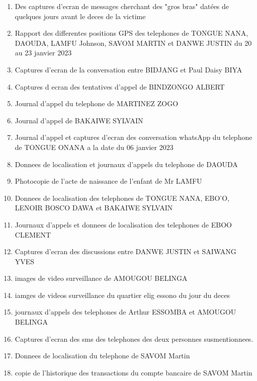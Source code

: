 \documentclass[12pt]{article}
\begin{document}
\begin{enumerate}

\item Des captures d'ecran de messages cherchant des "gros bras"  datées de quelques jours avant le deces de la victime

\item Rapport des differentes positions GPS des telephones de TONGUE NANA, DAOUDA, LAMFU Johnson, SAVOM MARTIN et DANWE JUSTIN du 20 au 23 janvier 2023

\item Captures d'ecran de la conversation entre BIDJANG et Paul Daisy BIYA 

\item Captures d
ecran des tentatives d'appel de BINDZONGO ALBERT

\item Journal d'appel du telephone de MARTINEZ ZOGO

\item Journal d'appel de BAKAIWE SYLVAIN

\item Journal d'appel et captures d'ecran des conversation whatsApp du telephone de TONGUE ONANA a la date du 06 janvier 2023

\item Donnees de localisation et journaux d'appels du telephone de DAOUDA

\item Photocopie de l'acte de naissance de l'enfant de Mr LAMFU

\item Donnees de localisation des telephones de TONGUE NANA, EBO'O, LENOIR BOSCO DAWA et BAKAIWE SYLVAIN

\item Journaux d'appels et donnees de localisation des telephones de EBOO CLEMENT

\item Captures d'ecran des discussions entre DANWE JUSTIN et SAIWANG YVES

\item images de video surveillance de AMOUGOU BELINGA

\item iamges de videos surveillance du quartier elig essono du jour du deces

\item journaux d'appels des telephones de Arthur ESSOMBA et AMOUGOU BELINGA

\item Captures d'ecran des sms des telephones des deux personnes susmentionnees.

\item Donnees de localisation du telephone de SAVOM Martin

\item copie de l'historique des transactions du compte bancaire de SAVOM Martin



\end{enumerate}
\end{document}
